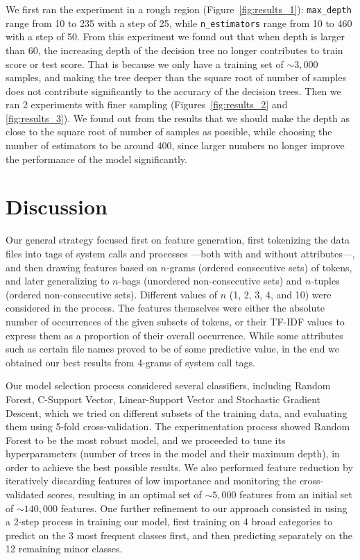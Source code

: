 \documentclass[11pt]{article}
\begin{document}
We first ran the experiment in a rough region (Figure~\ref{fig:results_1}): \verb|max_depth| range from 10 to 235 with a step of 25, while \verb|n_estimators| range from 10 to 460 with a step of 50. From this experiment we found out that when depth is larger than 60, the increasing depth of the decision tree no longer contributes to train score or test score. That is because we only have a training set of $\sim3,000$ samples, and making the tree deeper than the square root of number of samples does not contribute significantly to the accuracy of the decision trees. Then we ran 2 experiments with finer sampling (Figures~\ref{fig:results_2} and \ref{fig:results_3}). We found out from the results that we should make the depth as close to the square root of number of samples as possible, while choosing the number of estimators to be around 400, since larger numbers no longer improve the performance of the model significantly. 

\section{Discussion} 

Our general strategy focused first on feature generation, first tokenizing the data files into tags of system calls and processes ---both with and without attributes---, and then drawing features based on $n$-grams (ordered consecutive sets) of tokens, and later generalizing to $n$-bags (unordered non-consecutive sets) and $n$-tuples (ordered non-consecutive sets). Different values of $n$ (1, 2, 3, 4, and 10) were considered in the process. The features themselves were either the absolute number of occurrences of the given subsets of tokens, or their TF-IDF values to express them as a proportion of their overall occurrence. While some attributes such as certain file names proved to be of some predictive value, in the end we obtained our best results from 4-grams of system call tags.

Our model selection process considered several classifiers, including Random Forest, C-Support Vector, Linear-Support Vector and Stochastic Gradient Descent, which we tried on different subsets of the training data, and evaluating them using 5-fold cross-validation. The experimentation process showed Random Forest to be the most robust model, and we proceeded to tune its hyperparameters (number of trees in the model and their maximum depth), in order to achieve the best possible results. We also performed feature reduction by iteratively discarding features of low importance and monitoring the cross-validated scores, resulting in an optimal set of $\sim5,000$ features from an initial set of $\sim140,000$ features. One further refinement to our approach consisted in using a 2-step process in training our model, first training on 4 broad categories to predict on the 3 most frequent classes first, and then predicting separately on the 12 remaining minor classes.
\end{document}
